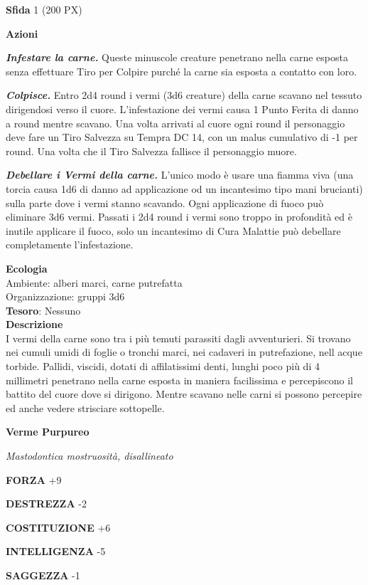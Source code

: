 \begin{multicols}{2}
\textbf{Sfida} 1 (200 PX)

\textbf{Azioni}

\textit{\textbf{Infestare la carne.}} Queste minuscole creature penetrano nella carne esposta senza effettuare Tiro per Colpire purché la carne sia esposta a contatto con loro.

\textit{\textbf{Colpisce.}} Entro 2d4 round i vermi (3d6 creature) della carne scavano nel tessuto dirigendosi verso il cuore. L'infestazione dei vermi causa 1 Punto Ferita di danno a round mentre scavano. Una volta arrivati al cuore ogni round il personaggio deve fare un Tiro Salvezza su Tempra DC 14, con un malus cumulativo di -1 per round. Una volta che il Tiro Salvezza fallisce il personaggio muore.

\textit{\textbf{Debellare i Vermi della carne.}} L'unico modo è usare una fiamma viva (una torcia causa 1d6 di danno ad applicazione od un incantesimo tipo mani brucianti) sulla parte dove i vermi stanno scavando. Ogni applicazione di fuoco può eliminare 3d6 vermi. Passati i 2d4 round i vermi sono troppo in profondità ed è inutile applicare il fuoco, solo un incantesimo di Cura Malattie può debellare completamente l'infestazione.

\textbf{Ecologia}\\
Ambiente: alberi marci, carne putrefatta\\
Organizzazione: gruppi 3d6\\
\textbf{Tesoro}: Nessuno\\
\textbf{Descrizione}\\

I vermi della carne sono tra i più temuti parassiti dagli avventurieri. Si trovano nei cumuli umidi di foglie o tronchi marci, nei cadaveri in putrefazione, nell acque torbide. Pallidi, viscidi, dotati di affilatissimi denti, lunghi poco più di 4 millimetri penetrano nella carne esposta in maniera facilissima e percepiscono il battito del cuore dove si dirigono. Mentre scavano nelle carni si possono percepire ed anche vedere strisciare sottopelle.


\medskip{}\textbf{Verme Purpureo}

\textit{Mastodontica mostruosità, disallineato}

\textbf{FORZA} +9

\textbf{DESTREZZA} -2

\textbf{COSTITUZIONE} +6

\textbf{INTELLIGENZA} -5

\textbf{SAGGEZZA} -1


\end{multicols}
